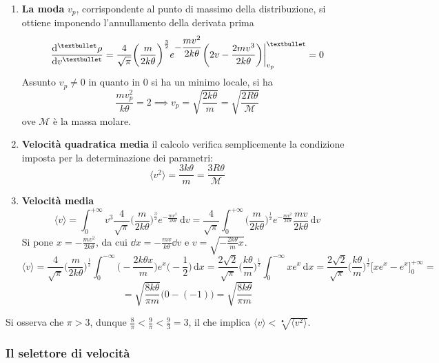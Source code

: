 \documentclass[10pt, oneside]{book}
\newcommand{\mean}[1]{\langle #1 \rangle}
\newcommand{\ds}{\displaystyle}
\newcommand{\integral}[4]{\int_{#1}^{#2} #3 \, \mathrm{d}#4}
\begin{document}
\begin{enumerate}
\item \textbf{La moda} $v_p$, corrispondente al punto di massimo della distribuzione, si ottiene imponendo l'annullamento della derivata prima 
\[\dv[•]{\rho}{v} = \frac{4}{\sqrt{\pi}} \bigg(\displaystyle \frac{m}{2k \theta}\bigg)^{ \frac{3}{2}}e^{\displaystyle - \frac{mv^2}{2k \theta}} \bigg(2v - \frac{2 m v^3}{2 k \theta}\bigg) \bigg|_{v_p}^{•} = 0\]
Assunto $v_p \neq 0$ in quanto in $0$ si ha un minimo locale, si ha
\[\frac{mv_p^2}{k \theta} = 2 \implies v_p = \sqrt{\frac{2 k \theta}{m}} = \sqrt{\frac{2 R \theta}{\mathcal{M}}}\]
ove $\mathcal{M}$ è la massa molare.
\item \textbf{Velocità quadratica media} il calcolo verifica semplicemente la condizione imposta per la determinazione dei parametri: 
\[\mean{v^2} = \frac{3 k \theta}{m} = \frac{3 R \theta}{\mathcal{M}}\]
\item \textbf{Velocità media}
\[\mean{v} = \int_{0}^{+\infty} v^3 \frac{4}{\sqrt{\pi}} \bigg(\displaystyle \frac{m}{2k \theta}\bigg)^{ \frac{3}{2}} e^{\displaystyle - \frac{mv^2}{2k \theta}}\, \mathrm{d}v = \frac{4}{\sqrt{\pi}} \integral{0}{+\infty}{\bigg( \ds \frac{m}{2k \theta}\bigg)^{\frac{1}{2}}e^{\displaystyle - \frac{mv^2}{2k \theta}} \frac{mv}{2k \theta}}{v}\]
Si pone $\ds x = - \frac{mv^2}{2k\theta}$, da cui $\dd{x} = - \frac{mv}{k\theta}\dd{v}$ e $\ds v = \sqrt{- \frac{2k\theta}{m} x}$.
\[\mean{v} = \frac{4}{\sqrt{\pi}} \bigg(\displaystyle \frac{m}{2k \theta}\bigg)^{ \frac{1}{2}} \integral{0}{-\infty}{\bigg(- \frac{2k\theta x}{m}\bigg) e^x \bigg(- \frac{1}{2}\bigg)}{x} = \frac{2\sqrt{2}}{\sqrt{\pi}} \bigg(\frac{k \theta}{m}\bigg)^{\frac{1}{2}} \int_{0}^{-\infty} x e^x \, \mathrm{d}x = \frac{2\sqrt{2}}{\sqrt{\pi}} \bigg(\frac{k \theta}{m}\bigg)^{\frac{1}{2}} \bigg[x e^x - e^x \bigg]_0^{+\infty} = \]
\[= \sqrt{\frac{8 k \theta}{\pi m}} \big(0 - (-1) \big) = \sqrt{\frac{8 k \theta}{\pi m}}\]
\end{enumerate}
Si osserva che $\pi > 3$, dunque $\ds \frac{8}{\pi} < \frac{9}{\pi} < \frac{9}{3} = 3$, il che implica $\ds \mean{v} < \sqrt[•]{\mean{v^2}}$.


\subsubsection{Il selettore di velocità}
\end{document}
